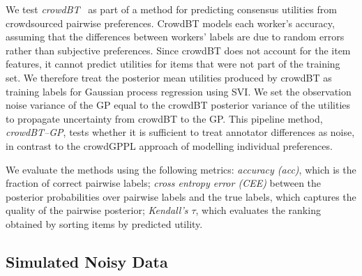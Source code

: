 We test \emph{crowdBT}~\citep{chen2013pairwise} as part of a method for
predicting consensus utilities from crowdsourced pairwise preferences.
CrowdBT models each worker's accuracy, assuming that
the differences between workers' labels are 
due to random errors rather than subjective preferences.
Since crowdBT does not account for the item features,
it cannot predict utilities for items that were not part of the training set.
We therefore treat the posterior mean utilities produced by crowdBT as training labels
for Gaussian process regression using SVI.
We set the observation noise variance of the GP equal to the crowdBT posterior variance
of the utilities 
to propagate uncertainty from crowdBT to the GP. 
This pipeline method, \emph{crowdBT--GP}, 
tests whether it is sufficient to treat annotator differences as noise,
in contrast to the crowdGPPL approach of modelling individual preferences.


We evaluate the methods using the following metrics:
\emph{accuracy (acc)}, which is the fraction of correct pairwise labels;
\emph{cross entropy error (CEE)} between the posterior probabilities over pairwise labels
and the true labels, which captures the quality of the pairwise posterior;
\emph{Kendall's $\tau$}, which evaluates the ranking obtained by sorting items by
predicted utility.

\subsection{Simulated Noisy Data}\label{sec:exp_synth}


